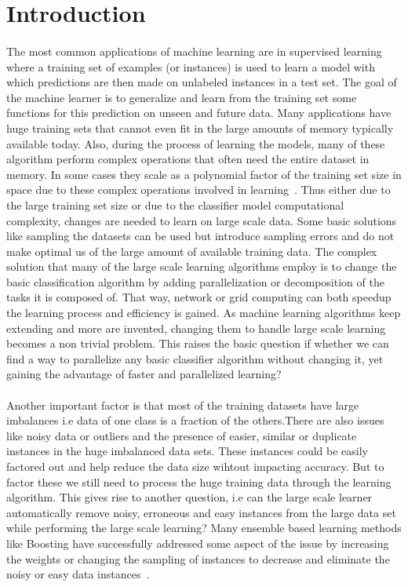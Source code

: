 \documentclass{llncs}
\begin{document}
\section{Introduction}
\paragraph{}
The most common applications of machine learning are in supervised learning where a training set of examples (or instances) is used to learn a model with which predictions are then made on unlabeled instances in a test set. The goal of the machine learner is to generalize and learn from the training set some functions for this prediction on unseen and future data. Many applications have huge training sets that cannot even fit in the large amounts of memory typically available today. Also, during the process of learning the models, many of these algorithm perform complex operations that often need the entire dataset in memory. In some cases they scale as a polynomial factor of the training set size in space due to these complex operations involved in learning~\cite{BordesBG09}. Thus either due to the large training set size or due to the classifier model computational complexity, changes are needed to learn on large scale data. Some basic solutions like sampling the datasets can be used but introduce sampling errors and do not make optimal us of the large amount of available training data. The complex solution that many of the large scale learning algorithms employ is to change the basic classification algorithm by adding parallelization or decomposition of the tasks it is composed of.  That way, network or grid computing can both speedup  the learning process and efficiency is gained. As machine learning algorithms keep extending and more are invented, changing them to handle large scale learning becomes a non trivial problem. This raises the basic question if whether we can find a way to parallelize any basic classifier algorithm without changing it, yet gaining the advantage of faster and parallelized learning? 
\paragraph{}
Another important factor is that most of the training datasets have large imbalances i.e data of one class is a fraction of the others.There are also issues like noisy data or outliers and the presence of easier, similar or duplicate instances in the huge imbalanced data sets. These instances could be easily factored out and help reduce the data size wihtout impacting accuracy. But to factor these we still need to process the huge training data through the learning algorithm. This gives rise to another question, i.e can the large scale learner automatically remove noisy, erroneous and easy instances from the large data set while performing the large scale learning? Many ensemble based learning methods like Boosting have successfully addressed some aspect of the issue by increasing the weights or changing the sampling of instances to decrease and eliminate the noisy or easy data instances~\cite{Schapire97boosting}.
\end{document}
